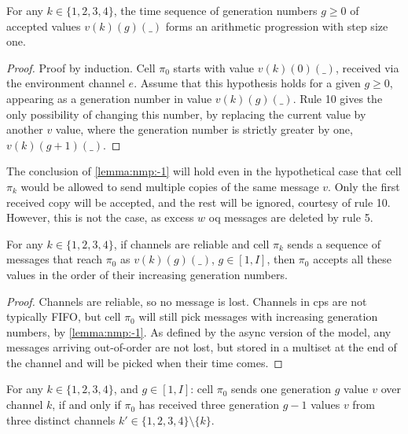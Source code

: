 \begin{lemma}\label{lemma:nmp:-1}
    For any $k \in \{ 1, 2, 3, 4 \}$, the time sequence of generation numbers $g \geq 0$ of accepted values $v(k)(g)(\_)$ forms an arithmetic progression with step size one.
\end{lemma}

\begin{proof}
    Proof by induction. Cell $\pi_0$ starts with value $v(k)(0)(\_)$, received via the environment channel $e$.
    Assume that this hypothesis holds for a given $g \geq 0$, appearing as a generation number in value $v(k)(g)(\_)$. Rule 10 gives the only possibility of changing this number, by replacing the current value by another $v$ value, where the generation number is strictly greater by one, 
    $v(k)(g+1)(\_)$. %
\end{proof}

\begin{remark}\label{remark:nmp:-1}
The conclusion of \cref{lemma:nmp:-1} will hold even in the hypothetical case that cell $\pi_k$ would be allowed to send multiple copies of the same message $v$. 
Only the first received copy will be accepted, and the rest will be ignored,
courtesy of rule 10. However, this is not the case, as excess \(w\) \gls{oq} messages are deleted by rule 5. 
\end{remark}

\begin{lemma}\label{lemma:nmp:-2}
    For any $k \in \{ 1, 2, 3, 4 \}$, if channels are reliable and cell $\pi_k$ sends a sequence of messages that reach $\pi_0$ as $v(k)(g)(\_)$, $g \in [1,I]$, 
    then $\pi_0$ accepts all these values in the order of their increasing generation numbers.
\end{lemma}

\begin{proof}
    Channels are reliable, so no message is lost. Channels in \gls{cps} are not typically FIFO, but cell $\pi_0$ will still pick messages with increasing generation numbers, by \cref{lemma:nmp:-1}.
    As defined by the async version of the model, any messages arriving out-of-order are not lost, but stored in a multiset at the end of the channel
    and will be picked when their time comes. %
\end{proof}

\begin{lemma}\label{lemma:nmp:-3}
    For any $k \in \{ 1, 2, 3, 4 \}$, and $g \in [1, I]$: cell $\pi_0$ sends one generation $g$ value $v$ over channel $k$, if and only if $\pi_0$ has received three generation $g-1$ values $v$ from three distinct channels $k' \in 
    \{ 1, 2, 3, 4 \} \setminus \{ k \}$.
\end{lemma}


